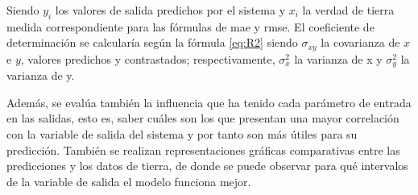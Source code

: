 \par Siendo $y_i$ los valores de salida predichos por el sistema y $x_i$ la verdad de tierra medida correspondiente para las fórmulas de \gls{mae} y \gls{rmse}. El coeficiente de determinación se calcularía según la fórmula \ref{eq:R2} siendo $\sigma_{xy}$ la covarianza de $x$ e $y$, valores predichos y contrastados; respectivamente, $\sigma^2_x$ la varianza de x y $\sigma^2_y$ la varianza de y. 
\\
\par Además, se evalúa también la influencia que ha tenido cada parámetro de entrada en las salidas, esto es, saber cuáles son los que presentan una mayor correlación con la variable de salida del sistema y por tanto son más útiles para su predicción. También se realizan representaciones gráficas comparativas entre las predicciones y los datos de tierra, de donde se puede observar para qué intervalos de la variable de salida el modelo funciona mejor.
